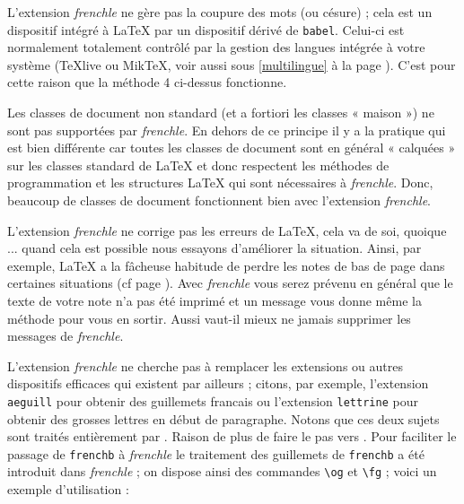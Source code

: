 \documentclass[a4paper,12pt,openright]{article}
\begin{document}
L’extension \textit{frenchle} ne gère pas la coupure des mots (ou césure) ; cela est
un dispositif intégré à \LaTeX{} par un dispositif dérivé de \texttt{babel}.
Celui-ci est normalement totalement contrôlé par la gestion des langues intégrée
à votre système (\TeX{}live ou Mik\TeX, voir aussi sous \ref{multilingue} à la page \pageref{multilingue}).
C'est pour cette raison que la méthode 4 ci-dessus %
fonctionne.

Les classes de document non standard (et a fortiori les classes « maison »)  %
ne sont pas supportées par \textit{frenchle}. En dehors de ce principe il y a la pratique
qui est bien différente car toutes les classes de document sont en général
« calquées » sur les classes standard de \LaTeX{} et donc respectent les méthodes
de programmation et les structures \LaTeX{} qui sont nécessaires à \textit{frenchle}. Donc,
beaucoup de classes de document fonctionnent bien avec l’extension \textit{frenchle}.

L’extension \textit{frenchle} ne corrige pas les erreurs de \LaTeX, cela va de soi,
quoique ... quand cela est possible nous essayons d’améliorer la situation. Ainsi, par
exemple, \LaTeX{} a la fâcheuse habitude de perdre les notes de bas de page dans
certaines situations (cf page \pageref{notesfigu}). Avec \textit{frenchle} vous serez prévenu en général que
le texte de votre note n’a pas été imprimé et un message vous donne même la méthode
pour vous en sortir. Aussi vaut-il mieux ne jamais supprimer les messages de
\textit{frenchle}.

L’extension \textit{frenchle} ne cherche pas à remplacer les extensions ou autres dispositifs
efficaces qui existent par ailleurs ; citons, par exemple, l’extension \texttt{aeguill}
pour obtenir des guillemets francais ou l’extension \texttt{lettrine} pour obtenir des
grosses lettres en début de paragraphe. Notons que ces deux sujets sont traités
entièrement par \slefr .
Raison de plus de faire le pas vers \slefr .
Pour faciliter le passage de  \texttt{frenchb} à \textit{frenchle} le traitement des guillemets
de  \texttt{frenchb} a été introduit dans \textit{frenchle} ; on dispose ainsi des commandes \verb|\og|
et \verb|\fg| ; voici un exemple d’utilisation :
\end{document}
